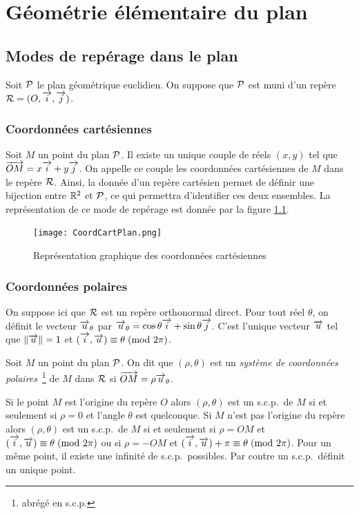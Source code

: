 \chapter{Géométrie élémentaire du plan}
\label{chap:geomplan}
\minitoc
\minilof
\minilot
\section{Modes de repérage dans le plan}
\label{sec:modederep}
Soit \(\P\) le plan géométrique euclidien. On suppose que \(\P\) est muni d'un repère \(\Rep=(O,\vi, \vj)\).
%
\subsection{Coordonnées cartésiennes}
\label{subsec:coordcart}
\begin{defdef}
  Soit \(M\) un point du plan \(\P\). Il existe un unique couple de réels 
  \((x,y)\) tel que \(\vect{OM}=x\vi+y\vj\). On appelle ce couple les 
  coordonnées cartésiennes de \(M\) dans le repère \(\Rep\). Ainsi, la donnée 
  d'un repère cartésien permet de définir une bijection entre \(\R^2\) et 
  \(\P\), ce qui permettra d'identifier ces deux ensembles. La représentation de 
  ce mode de repérage est donnée par la figure \ref{fig:coordcart}.
\end{defdef}
\begin{figure}
  \centering
  \texttt{[image: CoordCartPlan.png]}
  \caption{Représentation graphique des coordonnées cartésiennes}
  \label{fig:coordcart}
\end{figure}
%
\subsection{Coordonnées polaires}
\label{subsec:coordpol}
  On suppose ici que \(\Rep\) est un repère orthonormal direct. Pour tout réel \(\theta\), on définit le vecteur \(\vu_\theta\) par \(\vu_\theta=\cos\theta\vi+\sin\theta\vj\). C'est l'unique vecteur \(\vu\) tel que \(\norme{\vu}=1\) et \(\congru{(\vi,\vu)}{\theta}{2\pi}\).
\begin{defdef}
  Soit \(M\) un point du plan \(\P\). On dit que \((\rho,\theta)\) est un \emph{système de coordonnées polaires}~\footnote{abrégé en s.c.p.} de \(M\) dans \(\Rep\) si \(\vect{OM}=\rho\vu_\theta\).
\end{defdef}

Si le point \(M\) est l'origine du repère \(O\) alors \((\rho,\theta)\) est un s.c.p.\ de \(M\) si et seulement si \(\rho=0\) et l'angle \(\theta\) est quelconque. Si \(M\) n'est pas l'origine du repère alors \((\rho,\theta)\) est un s.c.p.\ de \(M\) si et seulement si \(\rho=OM\) et \(\congru{(\vi,\vu)}{\theta}{2\pi}\) ou si \(\rho=-OM\) et \(\congru{(\vi,\vu)+\pi}{\theta}{2\pi}\). Pour un même point, il existe une infinité de s.c.p.\ possibles. Par contre un s.c.p.\ définit un unique point.

